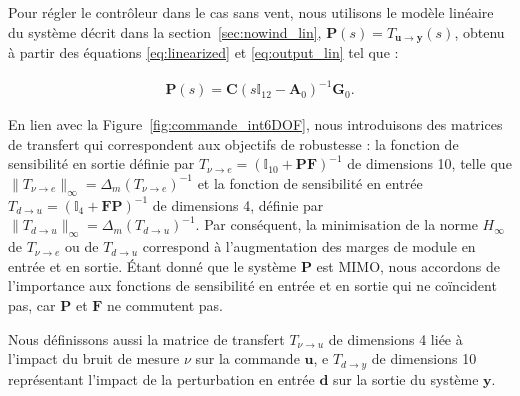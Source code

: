 Pour régler le contrôleur dans le cas sans vent, nous utilisons le modèle linéaire du système décrit dans la section~\ref{sec:nowind_lin}, $\boldsymbol{P}(s) = T_{\boldsymbol{u} \rightarrow \boldsymbol{y}}(s)$, obtenu à partir des équations \eqref{eq:linearized} et \eqref{eq:output_lin} tel que :

\begin{align*}
    \boldsymbol{P}(s) = \boldsymbol{C} (s \mathbb{I}_{12} - \boldsymbol{A}_{0})^{-1} \boldsymbol{G}_{0}.
\end{align*} 

En lien avec la Figure~\ref{fig:commande_int6DOF}, nous introduisons des matrices de transfert qui correspondent aux objectifs de robustesse : la fonction de sensibilité en sortie définie par $T_{\nu \rightarrow e}=(\mathbb{I}_{10}+\boldsymbol{P}\boldsymbol{F})^{-1}$ de dimensions 10, telle que $\lVert T_{\nu \rightarrow e} \rVert _{\infty}=\Delta_m(T_{\nu \rightarrow e})^{-1} $ et la fonction de sensibilité en entrée $T_{d \rightarrow u}=(\mathbb{I}_{4}+\boldsymbol{F}\boldsymbol{P})^{-1}$ de dimensions 4, définie par $\lVert T_{d \rightarrow u} \rVert _{\infty}=\Delta_m(T_{d \rightarrow u})^{-1}$.
Par conséquent, la minimisation de la norme $H_{\infty}$ de $T_{\nu \rightarrow e}$ ou de $T_{d \rightarrow u}$ correspond à l'augmentation des marges de module en entrée et en sortie. Étant donné que le système $\boldsymbol{P}$ est MIMO, nous accordons de l'importance aux fonctions de sensibilité en entrée et en sortie qui ne coïncident pas, car $\boldsymbol{P}$ et $\boldsymbol{F}$ ne commutent pas.

Nous définissons aussi la matrice de transfert $T_{\nu \rightarrow u}$ de dimensions 4 liée à l'impact du bruit de mesure $\nu$ sur la commande $\boldsymbol{u}$, e $T_{d \rightarrow y}$ de dimensions 10 représentant l'impact de la perturbation en entrée $\boldsymbol{d}$ sur la sortie du système $\boldsymbol{y}$. 

